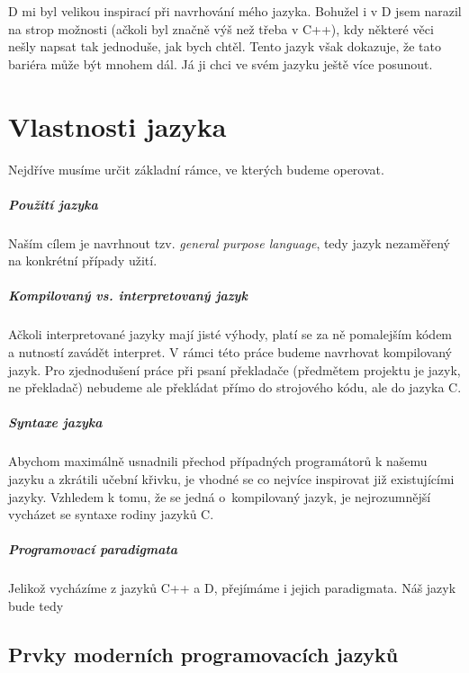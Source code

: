 D mi byl velikou inspirací při navrhování mého jazyka. Bohužel i v D jsem narazil na strop možnosti (ačkoli byl značně výš než třeba v C++), kdy některé věci nešly napsat tak jednoduše, jak bych chtěl. Tento jazyk však dokazuje, že tato bariéra může být mnohem dál. Já ji chci ve svém jazyku ještě více posunout. 

\chapter{Vlastnosti jazyka}
Nejdříve musíme určit základní rámce, ve kterých budeme operovat.

\paragraph{Použití jazyka}
Naším cílem je navrhnout tzv. \textit{general purpose language}, tedy jazyk nezaměřený na konkrétní případy užití.

\paragraph{Kompilovaný vs. interpretovaný jazyk}
Ačkoli interpretované jazyky mají jisté výhody, platí se za ně pomalejším kódem a nutností zavádět interpret. V rámci této práce budeme navrhovat kompilovaný jazyk. Pro zjednodušení práce při psaní překladače (předmětem projektu je jazyk, ne překladač) nebudeme ale překládat přímo do strojového kódu, ale do jazyka C.

\paragraph{Syntaxe jazyka}
Abychom maximálně usnadnili přechod případných programátorů k našemu jazyku a zkrátili učební křivku, je vhodné se co nejvíce inspirovat již existujícími jazyky. Vzhledem k tomu, že se jedná o~kompilovaný jazyk, je nejrozumnější vycházet se syntaxe rodiny jazyků C.

\paragraph{Programovací paradigmata}
Jelikož vycházíme z jazyků C++ a D, přejímáme i jejich paradigmata. Náš jazyk bude tedy

\section{Prvky moderních programovacích jazyků}

          

